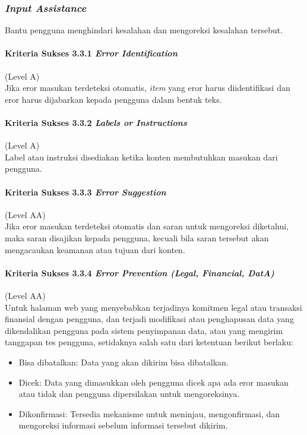 \subsubsection{\textit{Input Assistance}}
\label{sec:input_assistance}
Bantu pengguna menghindari kesalahan dan mengoreksi kesalahan tersebut.

\paragraph{Kriteria Sukses 3.3.1 \textit{Error Identification}}
\label{sec:kriteria_sukses_3.3.1}
(Level A)\\

Jika eror masukan terdeteksi otomatis, \textit{item} yang eror harus diidentifikasi dan eror harus dijabarkan kepada pengguna dalam bentuk teks.

\paragraph{Kriteria Sukses 3.3.2 \textit{Labels or Instructions}}
\label{sec:kriteria_sukses_3.3.2}
(Level A)\\

Label atau instruksi disediakan ketika konten membutuhkan masukan dari pengguna.

\paragraph{Kriteria Sukses 3.3.3 \textit{Error Suggestion}}
\label{sec:kriteria_sukses_3.3.3}
(Level AA)\\

Jika eror masukan terdeteksi otomatis dan saran untuk mengoreksi diketahui, maka saran disajikan kepada pengguna, kecuali bila saran tersebut akan mengacaukan keamanan atau tujuan dari konten.

\paragraph{Kriteria Sukses 3.3.4 \textit{Error Prevention (Legal, Financial, DatA)\\}}
\label{sec:kriteria_sukses_3.3.4}
(Level AA)\\

Untuk halaman web yang menyebabkan terjadinya komitmen legal atau transaksi finansial dengan pengguna, dan terjadi modifikasi atau penghapusan data yang dikendalikan pengguna pada sistem penyimpanan data, atau yang mengirim tanggapan tes pengguna, setidaknya salah satu dari ketentuan berikut berlaku:
\begin{itemize}
	\item Bisa dibatalkan: Data yang akan dikirim bisa dibatalkan.
	\item Dicek: Data yang dimasukkan oleh pengguna dicek apa ada eror masukan atau tidak dan pengguna dipersilakan untuk mengoreksinya.
	\item Dikonfirmasi: Tersedia mekanisme untuk meninjau, mengonfirmasi, dan mengoreksi informasi sebelum informasi tersebut dikirim.
\end{itemize}

